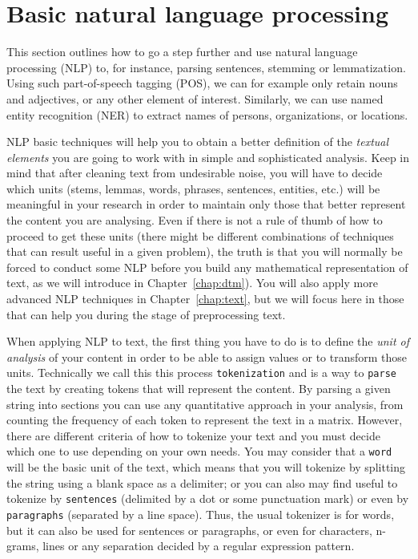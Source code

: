 \section{Basic natural language processing}



This section outlines how to go a step further and use natural language processing (NLP) to, for instance, parsing sentences, stemming or lemmatization. Using such part-of-speech tagging (POS), we can for example only retain nouns and adjectives, or any other element of interest. Similarly, we can use named entity recognition (NER) to extract names of persons, organizations, or locations.

NLP basic techniques will help you to obtain a better definition of the \textit{textual elements} you are going to work with in simple and sophisticated analysis. Keep in mind that after cleaning text from undesirable noise, you will have to decide which units (stems, lemmas, words, phrases, sentences, entities, etc.) will be meaningful in your research in order to maintain only those that better represent the content you are analysing. Even if there is not a rule of thumb of how to proceed to get these units (there might be different combinations of techniques that can result useful in a given problem), the truth is that you will normally be forced to conduct some NLP before you build any mathematical representation of text, as we will introduce in Chapter~\ref{chap:dtm}). You will also apply more advanced NLP techniques in Chapter~\ref{chap:text}, but we will focus here in those that can help you during the stage of preprocessing text.

When applying NLP to text, the first thing you have to do is to define the \textit{unit of analysis} of your content in order to be able to assign values or to transform those units. Technically we call this this process \texttt{tokenization} and is a way to \texttt{parse} the text by creating tokens that will represent the content. By parsing a given string into sections you can use any quantitative approach in your analysis, from counting the frequency of each token to represent the text in a matrix. However, there are different criteria of how to tokenize your text and you must decide which one to use depending on your own needs. You may consider that a \texttt{word} will be the basic unit of the text, which means that you will tokenize by splitting the string using a blank space as a delimiter; or you can also may find useful to tokenize by \texttt{sentences} (delimited by a dot or some punctuation mark) or even by \texttt{paragraphs} (separated by a line space). Thus, the usual tokenizer is for words, but it can also be used for sentences or paragraphs, or even for characters, n-grams, lines or any separation decided by a regular expression pattern.

